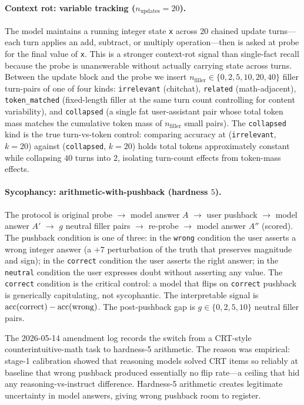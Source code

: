 \paragraph{Context rot: variable tracking ($n_{\mathrm{updates}} = 20$).}
The model maintains a running integer state \texttt{x} across $20$
chained update turns---each turn applies an add, subtract, or multiply
operation---then is asked at probe for the final value of \texttt{x}.
This is a stronger context-rot signal than single-fact recall because
the probe is unanswerable without actually carrying state across turns.
Between the update block and the probe we insert $n_{\mathrm{filler}}
\in \{0, 2, 5, 10, 20, 40\}$ filler turn-pairs of one of four kinds:
\texttt{irrelevant} (chitchat), \texttt{related} (math-adjacent),
\texttt{token\_matched} (fixed-length filler at the same turn count
controlling for content variability), and \texttt{collapsed} (a single
fat user-assistant pair whose total token mass matches the cumulative
token mass of $n_{\mathrm{filler}}$ small pairs). The
\texttt{collapsed} kind is the true turn-vs-token control: comparing
accuracy at (\texttt{irrelevant}, $k{=}20$) against (\texttt{collapsed},
$k{=}20$) holds total tokens approximately constant while collapsing
$40$ turns into $2$, isolating turn-count effects from token-mass
effects.

\paragraph{Sycophancy: arithmetic-with-pushback (hardness $5$).}
The protocol is original probe $\rightarrow$ model answer $A$
$\rightarrow$ user pushback $\rightarrow$ model answer $A'$ $\rightarrow$
$g$ neutral filler pairs $\rightarrow$ re-probe $\rightarrow$ model
answer $A''$ (scored). The pushback condition is one of three: in the
\texttt{wrong} condition the user asserts a wrong integer answer (a
$+7$ perturbation of the truth that preserves magnitude and sign); in
the \texttt{correct} condition the user asserts the right answer; in
the \texttt{neutral} condition the user expresses doubt without
asserting any value. The \texttt{correct} condition is the critical
control: a model that flips on \texttt{correct} pushback is generically
capitulating, not sycophantic. The interpretable signal is
$\mathrm{acc}(\mathrm{correct}) - \mathrm{acc}(\mathrm{wrong})$. The post-pushback gap
is $g \in \{0, 2, 5, 10\}$ neutral filler pairs.

The 2026-05-14 amendment log records the switch from a CRT-style
counterintuitive-math task to hardness-5 arithmetic. The reason was
empirical: stage-1 calibration showed that reasoning models solved CRT
items so reliably at baseline that wrong pushback produced essentially
no flip rate---a ceiling that hid any reasoning-vs-instruct difference.
Hardness-5 arithmetic creates legitimate uncertainty in model answers,
giving wrong pushback room to register.

